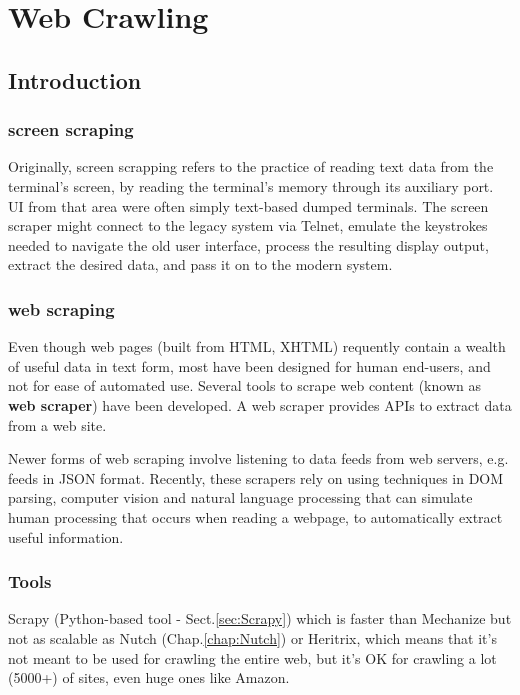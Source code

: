 \chapter{Web Crawling}
\label{chap:WebCrawling}

\section{Introduction}


\subsection{screen scraping}
\label{sec:screen_scrapping}

Originally, screen scrapping refers to the practice of reading text data from
the terminal's screen, by reading the terminal's memory through its auxiliary
port. UI from that area were often simply text-based dumped terminals.
The screen scraper might connect to the legacy system via Telnet, emulate the
keystrokes needed to navigate the old user interface, process the resulting
display output, extract the desired data, and pass it on to the modern system.




\subsection{web scraping}
\label{sec:web_scrapping}

Even though web pages (built from HTML, XHTML) requently contain a wealth of useful data in text form, most have been designed for human end-users, and not for ease of automated use.
Several tools to scrape web content (known as {\bf web scraper}) have been developed.
A web scraper provides APIs to extract data from a web site.

Newer forms of web scraping involve listening to data feeds from web servers, e.g. feeds in JSON format.
Recently, these scrapers rely on using techniques in DOM parsing, computer vision and natural language processing
that can simulate human processing that occurs when reading a webpage, to automatically extract useful information.

\subsection{Tools}

Scrapy (Python-based tool - Sect.\ref{sec:Scrapy}) which is faster than
Mechanize but not as scalable as Nutch (Chap.\ref{chap:Nutch}) or Heritrix,
which means that it's not meant to be used for crawling the entire web, but it's
OK for crawling a lot (5000+) of sites, even huge ones like Amazon.



